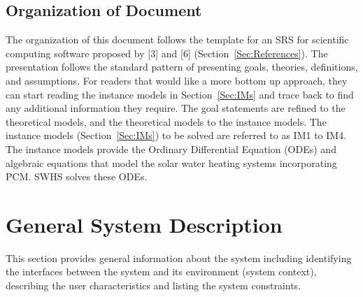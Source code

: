 \documentclass[12pt]{article}
\begin{document}
\subsection{Organization of Document}
\label{Sec:DocOrg}
The organization of this document follows the template for an SRS for scientific computing software proposed by {[}3{]} and {[}6{]} (Section~\ref{Sec:References}). The presentation follows the standard pattern of presenting goals, theories, definitions, and assumptions. For readers that would like a more bottom up approach, they can start reading the instance models in Section~\ref{Sec:IMs} and trace back to find any additional information they require.
The goal statements are refined to the theoretical models, and the theoretical models to the instance models. The instance models (Section~\ref{Sec:IMs}) to be solved are referred to as IM1 to IM4. The instance models provide the Ordinary Differential Equation (ODEs) and algebraic equations that model the solar water heating systems incorporating PCM. SWHS solves these ODEs.
\section{General System Description}
\label{Sec:GenSysDesc}
This section provides general information about the system including identifying the interfaces between the system and its environment (system context), describing the user characteristics and listing the system constraints.
\end{document}
